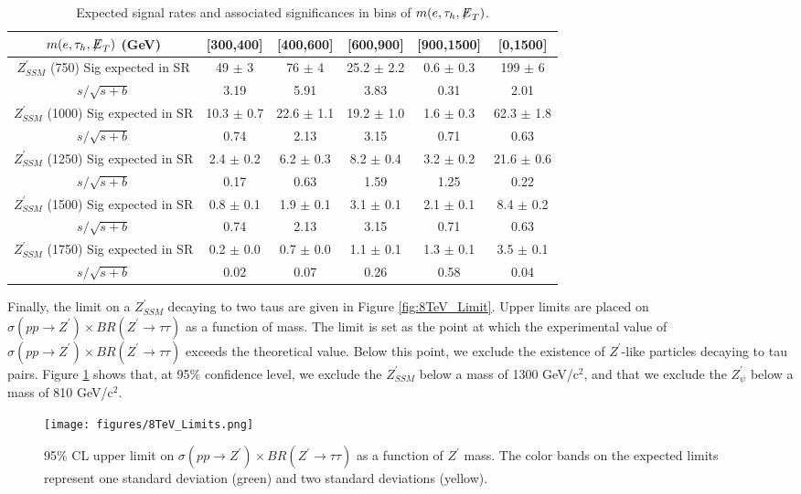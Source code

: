 \begin{table}[ht]
\begin{center}
  \caption{Expected signal rates and associated significances in bins of $m(e,\tau_{h},{\not\mathrel{E}}_T)$. }\label{tab:8TeV_SignalRates}
  \begin{tabular}{| c | c | c | c | c | c |}
  \hline
$m(e,\tau_{h},{\not\mathrel{E}}_T)$ (GeV) & [300,400] & [400,600] & [600,900] & [900,1500] & [0,1500]   \\ \hline
$Z^\prime_{SSM}$ (750) 
   Sig expected in SR  & 49 $\pm$ 3  & 76 $\pm$ 4  & 25.2 $\pm$ 2.2  & 0.6 $\pm$ 0.3 & 199 $\pm$ 6 \\
   $s/\sqrt{s+b}$ & 3.19  & 5.91 & 3.83 & 0.31 & 2.01   \\   \hline
$Z^\prime_{SSM}$ (1000)
   Sig expected in SR  & 10.3 $\pm$ 0.7  & 22.6 $\pm$ 1.1  & 19.2 $\pm$ 1.0  & 1.6 $\pm$ 0.3 & 62.3 $\pm$ 1.8 \\
   $s/\sqrt{s+b}$ & 0.74  & 2.13 & 3.15 & 0.71 & 0.63   \\   \hline
$Z^\prime_{SSM}$ (1250)
   Sig expected in SR  & 2.4 $\pm$ 0.2  & 6.2 $\pm$ 0.3  & 8.2 $\pm$ 0.4  & 3.2 $\pm$ 0.2 & 21.6 $\pm$ 0.6 \\
   $s/\sqrt{s+b}$ & 0.17  & 0.63 & 1.59 & 1.25 & 0.22   \\   \hline
  \hline
$Z^\prime_{SSM}$ (1500)
   Sig expected in SR  & 0.8 $\pm$ 0.1  & 1.9 $\pm$ 0.1  & 3.1 $\pm$ 0.1  & 2.1 $\pm$ 0.1 & 8.4 $\pm$ 0.2 \\
   $s/\sqrt{s+b}$ & 0.74  & 2.13 & 3.15 & 0.71 & 0.63   \\   \hline  
$Z^\prime_{SSM}$ (1750)
   Sig expected in SR  & 0.2 $\pm$ 0.0  & 0.7 $\pm$ 0.0  & 1.1 $\pm$ 0.1  & 1.3 $\pm$ 0.1 & 3.5 $\pm$ 0.1 \\
   $s/\sqrt{s+b}$ & 0.02  & 0.07 & 0.26 & 0.58 & 0.04   \\   \hline  
  \end{tabular}
\end{center}
\end{table}

Finally, the limit on a $Z^{\prime}_{SSM}$ decaying to two taus are given in Figure \ref{fig:8TeV_Limit}. Upper limits are placed on $\sigma\left(pp\to Z^{\prime}\right)\times BR\left(Z^{\prime}\to\tau\tau\right)$ as a function of mass. The limit is set as the point at which the experimental value of $\sigma\left(pp\to Z^{\prime}\right)\times BR\left(Z^{\prime}\to\tau\tau\right)$ exceeds the theoretical value. Below this point, we exclude the existence of $Z^{\prime}$-like particles decaying to tau pairs. Figure \ref{fig:8TeV_Limits} shows that, at 95\% confidence level, we exclude the $Z^{\prime}_{SSM}$ below a mass of 1300 GeV/c$^2$, and that we exclude the $Z^{\prime}_{\psi}$ below a mass of 810 GeV/c$^2$.

\begin{figure}[tbh!]
\centering
\texttt{[image: figures/8TeV\_Limits.png]}
\caption{95\% CL upper limit on $\sigma\left(pp\to Z^{\prime}\right)\times BR\left(Z^{\prime}\to\tau\tau\right)$ 
as a function of $Z^{\prime}$ mass. The color bands on the expected limits represent one standard deviation (green) and two standard deviations (yellow).}
\label{fig:8TeV_Limits}
\end{figure}
